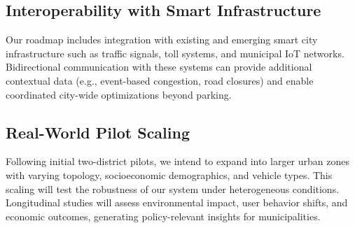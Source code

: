 \subsection{Interoperability with Smart Infrastructure}

Our roadmap includes integration with existing and emerging smart city infrastructure such as traffic signals, toll systems, and municipal IoT networks. Bidirectional communication with these systems can provide additional contextual data (e.g., event-based congestion, road closures) and enable coordinated city-wide optimizations beyond parking.

\subsection{Real-World Pilot Scaling}

Following initial two-district pilots, we intend to expand into larger urban zones with varying topology, socioeconomic demographics, and vehicle types. This scaling will test the robustness of our system under heterogeneous conditions. Longitudinal studies will assess environmental impact, user behavior shifts, and economic outcomes, generating policy-relevant insights for municipalities.